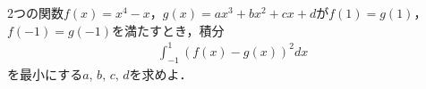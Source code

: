 \documentclass[../../main.tex]{subfiles}
\begin{document}
2つの関数$f(x)=x^4-x$，$g(x)=ax^3+bx^2+cx+d$が$f(1)=g(1)$，$f(-1)=g(-1)$を満たすとき，積分
\begin{align}
  \int_{-1}^1{(f(x)-g(x))}^2dx
\end{align}
を最小にする$a, \, b, \, c, \, d$を求めよ．
\end{document}
